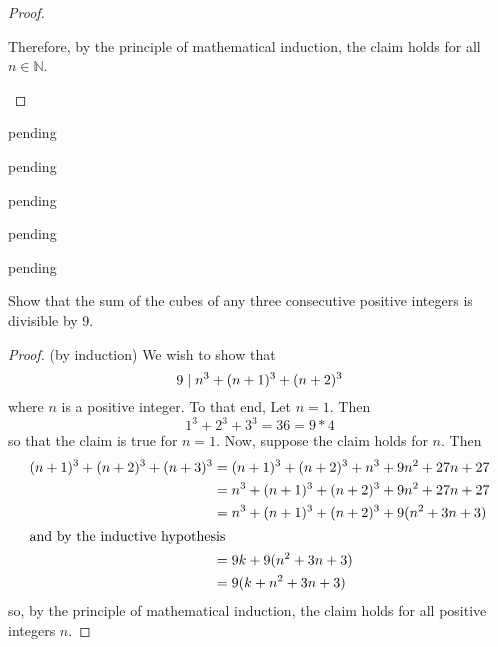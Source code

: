 \begin{exercise}
\begin{proof}
\begin{enumerate}
	        Therefore, by the principle of mathematical induction, the claim holds for all \( n \in \mathbb{N} \).
	    \end{enumerate}
	\end{proof}
\end{exercise}

\begin{exercise} \label{0.86}
	pending
\end{exercise}

\begin{exercise} \label{0.87}
	pending
\end{exercise}

\begin{exercise} \label{0.88}
	pending
\end{exercise}

\begin{exercise} \label{0.89}
	pending
\end{exercise}

\begin{exercise} \label{0.90}
	pending
\end{exercise}

\begin{exercise} \label{0.91}
	Show that the sum of the cubes of any three consecutive positive integers is divisible by 9.
	
	\begin{proof} (by induction) We wish to show that
	    \[ 9 \hspace{1mm} \vert \hspace{1mm} n^3 + (n+1)^3 + (n+2)^3 \]
	    where \( n \) is a positive integer. To that end, Let \( n=1 \). Then 
        \[ 1^3+2^3+3^3 = 36 = 9*4 \]
        so that the claim is true for \( n=1 \). Now, suppose the claim holds for \( n \). Then
        \begin{align*}
            (n+1)^3 + (n+2)^3 + (n+3)^3 &= (n+1)^3 + (n+2)^3 + n^3 + 9n^2 + 27n + 27 \\
            &= n^3 + (n+1)^3 + (n+2)^3 + 9n^2 + 27n + 27 \\
            &= n^3 + (n+1)^3 + (n+2)^3 + 9(n^2 + 3n + 3) \\
            \intertext{and by the inductive hypothesis}
            &= 9k + 9(n^2 + 3n + 3) \\
            &= 9(k + n^2 + 3n + 3)
        \end{align*}
        so, by the principle of mathematical induction, the claim holds for all positive integers \( n \).
	\end{proof}
\end{exercise}

